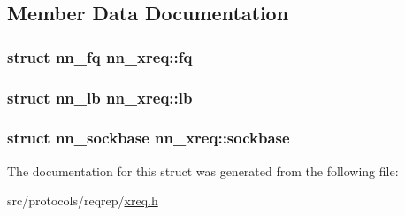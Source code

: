 \subsection{Member Data Documentation}
\subsubsection[{fq}]{\setlength{\rightskip}{0pt plus 5cm}struct {\bf nn\+\_\+fq} nn\+\_\+xreq\+::fq}\hypertarget{structnn__xreq_a2081c86c86e3b6e0d40ae050a81fa07d}{}\label{structnn__xreq_a2081c86c86e3b6e0d40ae050a81fa07d}
\subsubsection[{lb}]{\setlength{\rightskip}{0pt plus 5cm}struct {\bf nn\+\_\+lb} nn\+\_\+xreq\+::lb}\hypertarget{structnn__xreq_a5815e000462e4c1fd010e6fb6fec71bb}{}\label{structnn__xreq_a5815e000462e4c1fd010e6fb6fec71bb}
\subsubsection[{sockbase}]{\setlength{\rightskip}{0pt plus 5cm}struct {\bf nn\+\_\+sockbase} nn\+\_\+xreq\+::sockbase}\hypertarget{structnn__xreq_a788ba048cefed592907ffadb3d7e7a96}{}\label{structnn__xreq_a788ba048cefed592907ffadb3d7e7a96}


The documentation for this struct was generated from the following file\+:\begin{DoxyCompactItemize}
\item 
src/protocols/reqrep/\hyperlink{xreq_8h}{xreq.\+h}\end{DoxyCompactItemize}

